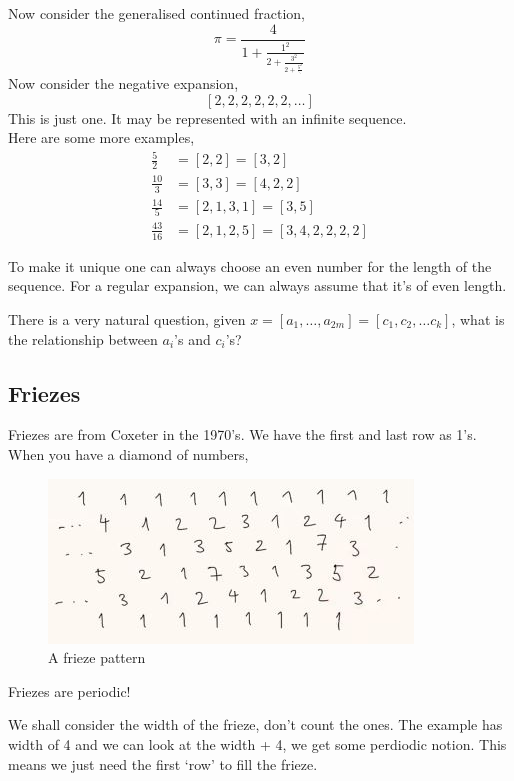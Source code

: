 \documentclass{article}
\begin{document}
Now consider the generalised continued fraction,
$$ \pi = \frac{4}{1 + \frac{1^2}{2 + \frac{3^2}{2 + \frac{5^2}{\ddots}}}} $$
Now consider the negative expansion,
$$ \![2, 2, 2, 2, 2, 2, \dots\!] $$
This is just one. It may be represented with an infinite sequence.\\

Here are some more examples,
\begin{align*}
  \frac{5}{2} &= [2, 2] = \![ 3, 2 \!]\\
  \frac{10}{3} &= [3, 3] = \![ 4, 2, 2 \!]\\
  \frac{14}{5} &= [2, 1, 3, 1] = \![ 3, 5 \!]\\
  \frac{43}{16} &= [2, 1, 2, 5] = \![ 3, 4, 2, 2, 2, 2 \!]
\end{align*}

\begin{remark}
  To make it unique one can always choose an even number for the length of the sequence. For a regular expansion, we can always assume that it's of even length.
\end{remark}

There is a very natural question, given $x = [a_1, \dots, a_{2m}] = \![c_1, c_2, \dots c_k \!]$, what is the relationship between $a_i$'s and $c_i$'s?

\subsection{Friezes}
Friezes are from Coxeter in the 1970's. We have the first and last row as 1's. When you have a diamond of numbers,

\begin{figure}[!ht]
  \centering
  \includegraphics{./figures/L1.1}
  \caption{A frieze pattern}
  \label{}
\end{figure}

\begin{nthm}[Coxeter]
  Friezes are periodic!
\end{nthm}

We shall consider the width of the frieze, don't count the ones. The example has width of 4 and we can look at the width + 4, we get some perdiodic notion. This means we just need the first `row' to fill the frieze.\\
\end{document}
